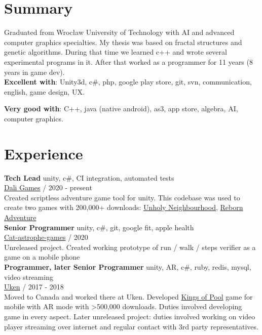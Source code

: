 \documentclass[12pt,a4paper]{article}
\begin{document}
\begin{multicols}{2}

\centering
\section*{Summary}
\justifying

	Graduated from Wrocław University of Technology with AI and advanced computer graphics specialties. My thesis was based on fractal structures and genetic algorithms. During that time we learned c++ and wrote several experimental programs in it. After that worked as a programmer for 11 years (8 years in game dev).
	\\

	\textbf{Excellent with}: Unity3d, c\#, php, google play store, git, svn, communication, english, game design, UX.

	\textbf{Very good with}: C++, java (native android), as3, app store, algebra, AI, computer graphics.

\centering
\section*{Experience }
\justifying
	 {\large \textbf{Tech Lead}}  \hfill \textcolor{techColor}{unity, c\#, CI integration, automated tests} \\
	{\href{https://dali.games/}{Dali Games}}  /  2020 - present  \\
	Created scriptless adventure game tool for unity. This codebase was used to create two games with 200,000+ downloads: {\href{https://play.google.com/store/apps/details?id=games.dali.adventure.neighborhood.unholy}{Unholy Neighbourhood}}, {\href{https://play.google.com/store/apps/details?id=games.dali.adventure.reborn}{Reborn Adventure}} \\

	{\large \textbf{Senior Programmer}} \hfill \textcolor{techColor}{unity, c\#, git, google fit, apple health} \\
	{\href{https://cat-astrophe-games.com/}{Cat-astrophe-games}}  /  2020 \\
	Unreleased project. Created working prototype of run / walk / steps verifier as a game on a mobile phone   \\

	{\large \textbf{Programmer, later Senior Programmer}} \hfill \textcolor{techColor}{unity, AR, c\#, ruby, redis, mysql, video streaming} \\
	{\href{https://www.uken.com/}{Uken}}  /  2017 - 2018 \\
	Moved to Canada and worked there at Uken. Developed {\href{https://play.google.com/store/apps/details?id=com.uken.pool}{Kings of Pool}} game for mobile with AR mode with \textgreater 500,000 downloads. Duties involved developing game in every aspect. Later unreleased project: duties involved working on video player streaming over internet and regular contact with 3rd party representatives. \\


\end{multicols}
\end{document}
